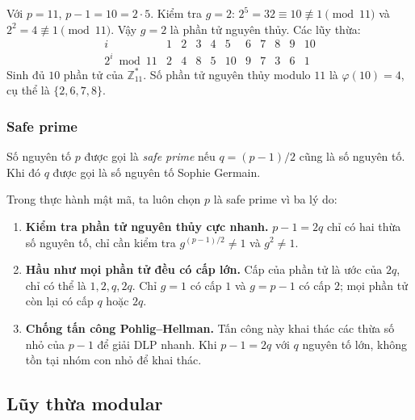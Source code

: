 \documentclass[../DoAn.tex]{subfiles}
\begin{document}
\begin{example}
\label{ex:primroot-11}
Với $p = 11$, $p - 1 = 10 = 2 \cdot 5$. Kiểm tra $g = 2$:
$2^5 = 32 \equiv 10 \not\equiv 1 \pmod{11}$ và $2^2 = 4 \not\equiv 1 \pmod{11}$. Vậy $g = 2$ là phần tử nguyên thủy. Các lũy thừa:
\[
\begin{array}{c|cccccccccc}
i & 1 & 2 & 3 & 4 & 5 & 6 & 7 & 8 & 9 & 10 \\
\hline
2^i \bmod 11 & 2 & 4 & 8 & 5 & 10 & 9 & 7 & 3 & 6 & 1
\end{array}
\]
Sinh đủ $10$ phần tử của $\mathbb{Z}_{11}^*$. Số phần tử nguyên thủy modulo $11$ là $\varphi(10) = 4$, cụ thể là $\{2, 6, 7, 8\}$.
\end{example}

\subsubsection{Safe prime}
\label{subsubsec:safe-prime}

\begin{definition}
Số nguyên tố $p$ được gọi là \emph{safe prime} nếu $q = (p-1)/2$ cũng là số nguyên tố. Khi đó $q$ được gọi là số nguyên tố Sophie Germain.
\end{definition}

Trong thực hành mật mã, ta luôn chọn $p$ là safe prime vì ba lý do:
\begin{enumerate}[leftmargin=*]
	\item \textbf{Kiểm tra phần tử nguyên thủy cực nhanh.} $p - 1 = 2q$ chỉ có hai thừa số nguyên tố, chỉ cần kiểm tra $g^{(p-1)/2} \neq 1$ và $g^2 \neq 1$.
	\item \textbf{Hầu như mọi phần tử đều có cấp lớn.} Cấp của phần tử là ước của $2q$, chỉ có thể là $1, 2, q, 2q$. Chỉ $g = 1$ có cấp $1$ và $g = p-1$ có cấp $2$; mọi phần tử còn lại có cấp $q$ hoặc $2q$.
	\item \textbf{Chống tấn công Pohlig--Hellman.} Tấn công này khai thác các thừa số nhỏ của $p-1$ để giải DLP nhanh. Khi $p - 1 = 2q$ với $q$ nguyên tố lớn, không tồn tại nhóm con nhỏ để khai thác.
\end{enumerate}

\subsection{Lũy thừa modular}
\label{subsec:modexp}
\end{document}
